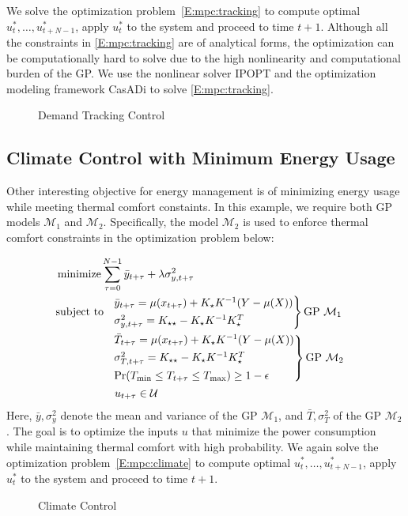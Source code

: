 We solve the optimization problem~\eqref{E:mpc:tracking} to compute optimal \(u_{t}^*, \dots, u_{t+N-1}^*\), apply \(u_{t}^*\) to the system and proceed to time \(t+1\).
Although all the constraints in \eqref{E:mpc:tracking} are of analytical forms, the optimization can be computationally hard to solve due to the high nonlinearity and computational burden of the GP.
We use the nonlinear solver IPOPT \cite{Waechter2009b} and the optimization modeling framework CasADi \cite{Andersson2013b} to solve \eqref{E:mpc:tracking}.

\begin{figure}
	\caption{Demand Tracking Control}
	\label{F:tracking}
\end{figure}

\subsection{Climate Control with Minimum Energy Usage}

Other interesting objective for energy management is of minimizing energy usage while meeting thermal comfort constaints. In this example, we require both GP models \(\mathcal{M}_1\) and \(\mathcal{M}_2\).
Specifically, the model \(\mathcal{M}_2\) is used to enforce thermal comfort constraints in the optimization problem below:

\begin{align}
&\operatorname*{minimize} \sum_{\tau=0}^{N-1} \bar{y}_{t+\tau} + \lambda \sigma^2_{y,t+\tau} \label{E:mpc:climate} \\
& 
\begin{aligned}
\text{subject to}\ \  & \begin{rcases}\bar{y}_{t+\tau} = \mu(x_{t+\tau}) + K_\star K^{-1} (Y - \mu(X)) \nonumber\\
\sigma^2_{y,t+\tau} = K_{\star \star} - K_\star K^{-1} K_\star^T
\end{rcases} \text{GP } \mathcal{M}_1 \\
& \begin{rcases}
 \bar{T}_{t+\tau} = \mu(x_{t+\tau}) + K_\star K^{-1} (Y - \mu(X)) \nonumber\\
\sigma^2_{T,t+\tau} = K_{\star \star} - K_\star K^{-1} K_\star^T \\
\Pr(T_{\mathrm{min}} \leq T_{t+\tau} \leq T_{\mathrm{max}}) \geq 1 - \epsilon \nonumber
\end{rcases} \text{GP } \mathcal{M}_2 \\
& \ u_{t+\tau} \in \mathcal{U} \nonumber
\end{aligned}
\end{align}
Here, \(\bar{y},\sigma^2_{y}\) denote the mean and variance of the GP \(\mathcal{M}_1\), and \(\bar{T},\sigma^2_{T}\) of the GP \(\mathcal{M}_2\). 
The goal is to optimize the inputs \(u\) that minimize the power consumption while maintaining thermal comfort with high probability. 
We again solve the optimization problem~\eqref{E:mpc:climate} to compute optimal \(u_{t}^*, \dots, u_{t+N-1}^*\), apply \(u_{t}^*\) to the system and proceed to time \(t+1\).

\begin{figure}
	\caption{Climate Control}
	\label{F:climate}
\end{figure}